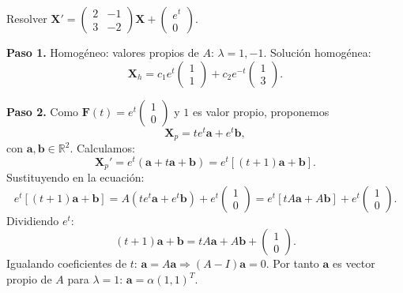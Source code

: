 \begin{example}
Resolver $\mathbf{X}'=
\begin{pmatrix}
2&-1\\
3&-2
\end{pmatrix}\mathbf{X}
+
\begin{pmatrix}
e^{t}\\0
\end{pmatrix}$.
\begin{myproof}
\textbf{Paso 1.} Homogéneo: valores propios de $A$: $\lambda=1,-1$. Solución homogénea:
\[
\mathbf{X}_h=c_1 e^{t}
\begin{pmatrix}
1\\1
\end{pmatrix}
+c_2 e^{-t}
\begin{pmatrix}
1\\3
\end{pmatrix}.
\]

\textbf{Paso 2.} Como $\mathbf{F}(t)=e^t\begin{pmatrix}1\\0\end{pmatrix}$ y $1$ es valor propio, proponemos
\[
\mathbf{X}_p=t e^t \mathbf{a}+ e^t \mathbf{b},
\]
con $\mathbf{a},\mathbf{b}\in\mathbb{R}^2$. Calculamos:
\[
\mathbf{X}_p'=e^t(\mathbf{a}+ t\mathbf{a}+\mathbf{b})=e^t[(t+1)\mathbf{a}+\mathbf{b}].
\]
Sustituyendo en la ecuación:
\[
e^t[(t+1)\mathbf{a}+\mathbf{b}]
= A(t e^t\mathbf{a}+e^t\mathbf{b})+e^t
\begin{pmatrix}
1\\0
\end{pmatrix}
= e^t[t A\mathbf{a}+ A\mathbf{b}]+e^t
\begin{pmatrix}
1\\0
\end{pmatrix}.
\]
Dividiendo $e^t$:
\[
(t+1)\mathbf{a}+\mathbf{b}=t A\mathbf{a}+ A\mathbf{b}+
\begin{pmatrix}
1\\0
\end{pmatrix}.
\]
Igualando coeficientes de $t$: $\mathbf{a}=A\mathbf{a}\Rightarrow (A-I)\mathbf{a}=0$. Por tanto $\mathbf{a}$ es vector propio de $A$ para $\lambda=1$: $\mathbf{a}=\alpha(1,1)^T$.


\end{myproof}
\end{example}
